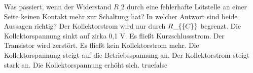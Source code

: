     {Was passiert, wenn der Widerstand $R\_2$ durch eine fehlerhafte Lötstelle an einer Seite keinen Kontakt mehr zur Schaltung hat? In welcher Antwort sind beide Aussagen richtig?}
    {Der Kollektorstrom wird nur durch $R\_\{\textrm\{C\}\}$ begrenzt. Die Kollektorspannung sinkt auf zirka 0,1 V.}
    {Es fließt Kurzschlussstrom. Der Transistor wird zerstört.}
    {Es fließt kein Kollektorstrom mehr. Die Kollektorspannung steigt auf die Betriebsspannung an.}
    {Der Kollektorstrom steigt stark an. Die Kollektorspannung erhöht sich.}
    {true}{false}